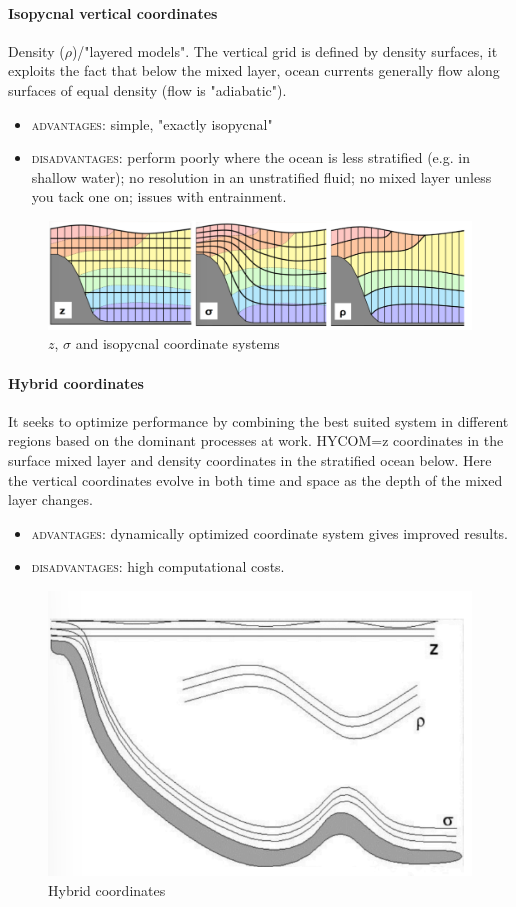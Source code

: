 \paragraph{Isopycnal vertical coordinates} Density ($\rho$)/"layered models". The vertical grid is defined by density surfaces, it exploits the fact that below the mixed layer, ocean currents generally flow along surfaces of equal density (flow is "adiabatic").
\begin{itemize}
	\item \textsc{advantages}: simple, "exactly isopycnal"
	\item \textsc{disadvantages}: perform poorly where the ocean is less stratified (e.g. in shallow water); no resolution in an unstratified fluid; no mixed layer unless you tack one on; issues with entrainment.
\end{itemize}
\begin{figure}[htp!]
	\centering
	\includegraphics[width=0.5\linewidth]{uploads/Screenshot 2024-11-22 001323.png}
	\caption{$z$, $\sigma$ and isopycnal coordinate systems}
	\label{fig:enter-label}
\end{figure}
\paragraph{Hybrid coordinates} It seeks to optimize performance by combining the best suited system in different regions based on the dominant processes at work. HYCOM=z coordinates in the surface mixed layer and density coordinates in the stratified ocean below. Here the vertical coordinates evolve in both time and space as the depth of the mixed layer changes.
\begin{itemize}
	\item \textsc{advantages}: dynamically optimized coordinate system gives improved results.
	\item\textsc{disadvantages}: high computational costs.
\end{itemize}

\begin{figure}[htp!]
	\centering
	\includegraphics[width=0.5\linewidth]{uploads/Screenshot 2024-11-22 000943.png}
	\caption{Hybrid coordinates}
	\label{fig:enter-label}
\end{figure}
